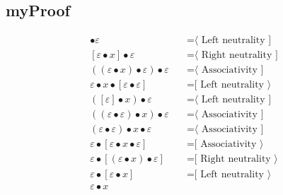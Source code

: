 \documentclass{article}
\begin{document}
\subsection{myProof}
\begin{align*}
[x] • ε
  & \quad \text{=⟨ Left neutrality ]}\\
[ε • x] • ε
  & \quad \text{=⟨ Right neutrality ]}\\
((ε • x) • ε) • ε
  & \quad \text{=⟨ Associativity ]}\\
ε • x • [ε • ε]
  & \quad \text{=[ Left neutrality ⟩}\\
([ε] • x) • ε
  & \quad \text{=⟨ Left neutrality ]}\\
((ε • ε) • x) • ε
  & \quad \text{=⟨ Associativity ]}\\
(ε • ε) • x • ε
  & \quad \text{=⟨ Associativity ]}\\
ε • [ε • x • ε]
  & \quad \text{=[ Associativity ⟩}\\
ε • [(ε • x) • ε]
  & \quad \text{=[ Right neutrality ⟩}\\
ε • [ε • x]
  & \quad \text{=[ Left neutrality ⟩}\\
ε • x
\end{align*}
\end{document}
